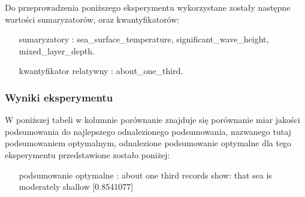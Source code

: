 \documentclass{article}
\begin{document}
Do przeprowadzenia poniższego eksperymentu wykorzystane zostały następne wartości sumaryzatorów, oraz kwantyfikatorów:

\begin{itemize}
    \item[sumaryzatory]: sea\_surface\_temperature, significant\_wave\_height, mixed\_layer\_depth.
    \item[kwantyfikator relatywny]: about\_one\_third.
\end{itemize}

\subsubsection{Wyniki eksperymentu}

W poniższej tabeli w kolumnie porównanie znajduje się porównanie miar jakości podsumowania do najlepszego odnalezionego podsumowania, nazwanego tutaj podsumowaniem optymalnym, odnalezione podsumowanie optymalne dla tego eksperymentu przedstawione zostało poniżej:

\begin{itemize}
    \item[podsumowanie optymalne]: about one third records show: that sea is moderately shallow  [0.8541077]
\end{itemize}
\end{document}

